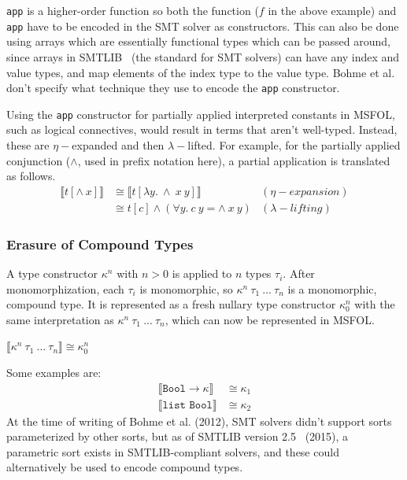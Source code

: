 \documentclass[11pt]{article}
\begin{document}
	\texttt{app} is a higher-order 
	function so both the function 
	($f$ in the above example) and 
	\texttt{app} have to be encoded 
	in the SMT solver as constructors.
	This can also be done using arrays 
	which are essentially functional 
	types which can be passed
	around, since arrays in 
	SMTLIB~\cite{BarFT-SMTLIB} (the 
	standard for SMT solvers)
	can have any index and value types, 
	and map elements of the index type 
	to the value type. Bohme et al. 
	don't specify what technique 
	they use to encode the 
	\texttt{app} constructor.
	
	Using the \texttt{app} constructor
	for partially applied interpreted 
	constants in MSFOL, such as 
	logical connectives, would result 
	in terms that aren't well-typed.
	Instead, these are $\eta-$expanded 
	and then $\lambda-$lifted. For example, 
	for the partially applied 
	conjunction ($\land$, used in prefix 
	notation here), a partial application is 
	translated as follows.
	\begin{align*}
	\llbracket t [\land\ x] 
	\rrbracket &\cong \llbracket 
	t[\lambda y.\ \land\ x\ y]
	\rrbracket&(\eta-expansion)\\
	&\cong t[c]  \land (\forall y.\ 
	c\ y = \land\ x\ y) &(\lambda-lifting)
	\end{align*}
	
	\subsubsection{Erasure of Compound Types}
	A type constructor $\kappa^n$ with 
	$n > 0$ is applied to $n$ types 
	$\tau_i$. After monomorphization, 
	each $\tau_i$ is monomorphic, so 
	$\kappa^n\ \tau_1\ ...\ \tau_n$ 
	is a monomorphic, compound type. It
	is represented as a fresh nullary 
	type constructor $\kappa_0^n$ with 
	the same interpretation as 
	$\kappa^n\ \tau_1\ ...\ \tau_n$, 
	which can now be represented in 
	MSFOL.
	\begin{center}
		$\llbracket \kappa^n\ 
		\tau_1\ ...\ \tau_n \rrbracket
		\cong \kappa_0^n$
	\end{center}
	Some examples are:
	\begin{align*}
	\llbracket \texttt{Bool} \to
	\kappa \rrbracket &\cong \kappa_1\\
	\llbracket \texttt{list\ Bool}
	\rrbracket &\cong \kappa_2
	\end{align*}
	At the time of writing of Bohme et al.
	(2012),	SMT solvers didn't support sorts 
	parameterized by other sorts, but as of
	SMTLIB version 2.5~\cite{BarFT-RR-15}
	(2015), 
	a parametric sort exists in 
	SMTLIB-compliant solvers, 
	and these could alternatively be 
	used to encode compound types.
	
\end{document}

